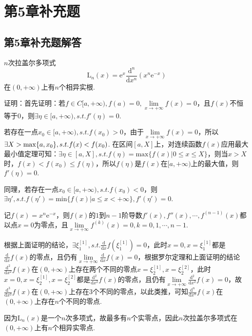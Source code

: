 \documentclass[12pt,UTF8]{ctexart}
\begin{document}
\def\thesection{8C}
\section{第5章补充题}
\def\thesubsection{\thesection.\arabic{subsection}}
\subsection{第5章补充题解答}
\begin{enumerate}
$n$次拉盖尔多项式
\[
\mathrm L_n(x)=\mathrm e^x\frac{\mathrm d^n}{\mathrm dx^n}(x^n\mathrm e^{-x})
\]在$(0,+\infty)$上有$n$个相异实根.

证明：首先证明：若$f\in C[a,+\infty),f(a)=0,\lim\limits_{x\rightarrow+\infty}f(x)=0$，且$f(x)$不恒等于$0$，则$\exists\eta\in[a,+\infty),s.t.f'(\eta)=0$.

若存在一点$x_0\in[a,+\infty),s.t.f(x_0)>0$，由于$\lim\limits_{x\rightarrow+\infty}f(x)=0$，所以$\exists X>\mathrm{max}\{a,x_0\},\\
s.t.f(x)<f(x_0)$. 在区间$[a,X]$上，对连续函数$f(x)$应用最大最小值定理可知：$\exists\eta\in[a,X],s.t.f(\eta)=\mathrm{max}\{f(x)|0\leq x\leq X\}$，则当$x>X$时，$f(x)<f(x_0)\leq f(\eta)$，所以$f(\eta)$是$f(x)$在$[a,+\infty)$上的最大值，则$f'(\eta)=0$.

同理，若存在一点$x_0\in[a,+\infty),s.t.f(x_0)<0$，则$\exists\eta',s.t.f(\eta')=\mathrm{min}\{f(x)|a\leq x<+\infty\},f'(\eta')=0$.

记$f(x)=x^n\mathrm e^{-x}$，则$f(x)$的$1$到$n-1$阶导数$f'(x),f''(x),\cdots,f^{(n-1)}(x)$都以点$x=0$为零点，且$\lim\limits_{x\rightarrow+\infty}f^{(k)}(x)=0,k=0,1,\cdots,n-1$.

根据上面证明的结论，$\exists\xi_1^{[1]},s.t.\frac{\mathrm d}{\mathrm dx}f(\xi_1^{[1]})=0$，此时$x=0,x=\xi_1^{[1]}$都是$\frac{\mathrm d}{\mathrm dx}f(x)$的零点，且仍有$\lim\limits_{x\rightarrow+\infty}\frac{\mathrm d}{\mathrm dx}f(x)=0$，根据罗尔定理和上面证明的结论$\frac{\mathrm d^2}{\mathrm dx^2}f(x)$在$(0,+\infty)$上存在两个不同的零点$x=\xi_2^{[1]},x=\xi_2^{[2]}$，此时$x=0,x=\xi_2^{[1]},x=\xi_2^{[2]}$都是$\frac{\mathrm d^2}{\mathrm dx^2}f(x)$的零点，且仍有$\lim\limits_{x\rightarrow+\infty}\frac{\mathrm d^2}{\mathrm dx^2}f(x)=0$，故$\frac{\mathrm d^3}{\mathrm dx^3}f(x)$在$(0,+\infty)$上存在$3$个不同的零点，以此类推，可知$\frac{\mathrm d^n}{\mathrm dx^n}f(x)$在$(0,+\infty)$上存在$n$个不同的零点.

因为$\mathrm L_n(x)$是一个$n$次多项式，故最多有$n$个实零点，因此$n$次拉盖尔多项式在$(0,+\infty)$上有$n$个相异实零点.


\end{enumerate}
\end{document}
